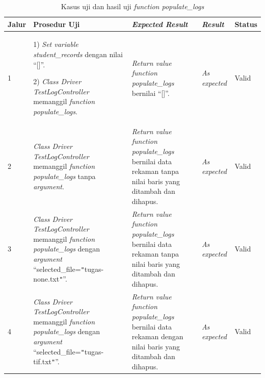 \begin{longtable}{|P{.06\textwidth}|P{.30\textwidth}|P{.30\textwidth}|P{.10\textwidth}|P{.08\textwidth}|}
  \caption{Kasus uji dan hasil uji \emph{function populate\_logs}} \label{jalur:populate_logs_integration}\\
  \hline
  \textbf{Jalur} & \textbf{Prosedur Uji} & \textbf{\emph{Expected Result}} & \textbf{\emph{Result}} & \textbf{Status} \\\hline
  1 & 1) \emph{Set variable student\_records} dengan nilai ``[]''.\par\null\par
      2) \emph{Class Driver TestLogController} memanggil \emph{function populate\_logs}.
                                         & \emph{Return value} \emph{function populate\_logs} bernilai
                                           ``[]''. & \emph{As expected} & Valid \\\hline
  2 & \emph{Class Driver TestLogController} memanggil \emph{function populate\_logs} tanpa \emph{argument}.
                                         & \emph{Return value} \emph{function populate\_logs} bernilai data
                                           rekaman tanpa nilai baris yang ditambah dan dihapus.
                                                                           & \emph{As expected} & Valid \\\hline
  3 & \emph{Class Driver TestLogController} memanggil \emph{function populate\_logs} dengan \emph{argument}
      ``selected\_file=\texttt{"}tugas-none.txt\texttt{"}''. & \emph{Return value} \emph{function populate\_logs} bernilai data
                                                               rekaman tanpa nilai baris yang ditambah dan dihapus.
                                                                           & \emph{As expected} & Valid \\\hline
  4 & \emph{Class Driver TestLogController} memanggil \emph{function populate\_logs} dengan \emph{argument}
      ``selected\_file=\texttt{"}tugas-tif.txt\texttt{"}''. & \emph{Return value} \emph{function populate\_logs} bernilai data
                                                               rekaman dengan nilai baris yang ditambah dan dihapus.
                                                                           & \emph{As expected} & Valid \\\hline
\end{longtable}

